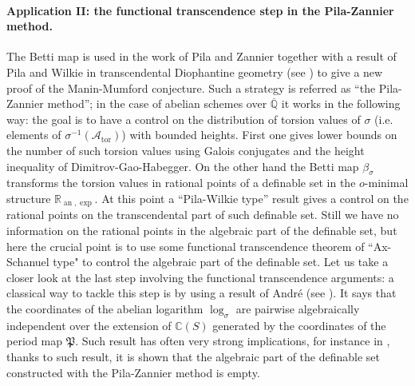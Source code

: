 \documentclass[10 pt,a4paper]{article}
\theoremstyle{plain}
\theoremstyle{definition}
\theoremstyle{named}
\DeclareMathOperator{\tor}{tor}
\newcommand{\cA}{\mathcal A}
\DeclareMathOperator{\an}{an}
\begin{document}
\paragraph{Application II: the functional transcendence step in the Pila-Zannier method.} The Betti map is used in the work \cite{PZ} of  Pila and Zannier together with a result of Pila and Wilkie in transcendental Diophantine geometry (see \cite{PiWi}) to give a new proof of the Manin-Mumford conjecture. Such a strategy is referred as ``the Pila-Zannier method''; in the case of abelian schemes over $\overline{\mathbb Q}$ it works in the following way: the goal is to have a control on the distribution of torsion values of $\sigma$ (i.e. elements of $\sigma^{-1}(\cA_{\tor})$) with bounded heights. First one gives  lower bounds on the number of such torsion values using Galois conjugates and the height inequality of Dimitrov-Gao-Habegger. On the other hand the Betti map $\beta_\sigma$ transforms the torsion values in rational points of a definable set in the $o$-minimal structure $\mathbb R_{\an,\exp}$. At this point a ``Pila-Wilkie type'' result  gives a  control on the rational points on the transcendental part of such definable set. Still we have no information on the rational points in the algebraic part of the definable set, but here the crucial point is to use some functional transcendence theorem of ``Ax-Schanuel type" to control the algebraic part of the definable set. Let us take a closer look at the last step involving the functional transcendence arguments: a classical way to tackle this step is by using a result of Andr\'e (see \cite[Theorem 3]{André}). It says that the coordinates of the abelian logarithm $\log_\sigma$ are pairwise algebraically independent over the extension of $\mathbb C(S)$ generated by the coordinates of the period map $\mathfrak P$. Such result has often very strong implications, for instance in \cite{DT}, thanks to such result, it is  shown that the algebraic part of the definable set constructed with the Pila-Zannier method is empty.
\end{document}
